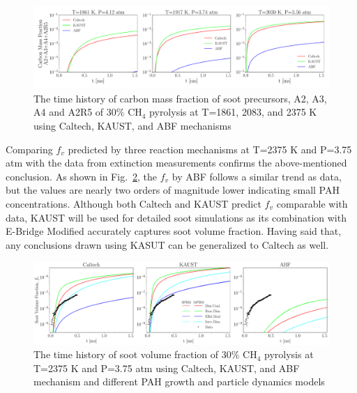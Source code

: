 \begin{figure}[H]
	\centering
	\includegraphics[width=1\textwidth]{Figures/Results/Shocktube/Stanford/june/30CH4_SPC_mechs_nosoot_subset.pdf}
	\caption{The time history of carbon mass fraction of soot precursors, A2, A3, A4 and A2R5 of 30\% $\mathrm{CH_4}$ pyrolysis at T=1861, 2083, and 2375 K using Caltech, KAUST, and ABF mechanisms}
	\label{fig:shocktubest_30ch4_spc_nosoot_subset} 
\end{figure}

Comparing $f_v$ predicted by three reaction mechanisms at T=2375 K and P=3.75 atm with the data from extinction measurements confirms the above-mentioned conclusion. As shown in Fig.~\ref{fig:shocktubest_30ch4_sootvf_single}, the $f_v$ by ABF follows a similar trend as data, but the values are nearly two orders of magnitude lower indicating small PAH concentrations. Although both Caltech and KAUST predict $f_v$ comparable with data, KAUST will be used for detailed soot simulations as its combination with E-Bridge Modified accurately captures soot volume fraction. Having said that, any conclusions drawn using KASUT can be generalized to Caltech as well.


\begin{figure}[H]
	\centering
	\includegraphics[width=1\textwidth]{Figures/Results/Shocktube/Stanford/june/30CH4_sootvf_mechs_single.pdf}
	\caption{The time history of soot volume fraction of 30\% $\mathrm{CH_4}$ pyrolysis at T=2375 K and P=3.75 atm using Caltech, KAUST, and ABF mechanism and different PAH growth and particle dynamics models}
	\label{fig:shocktubest_30ch4_sootvf_single} 
\end{figure}

